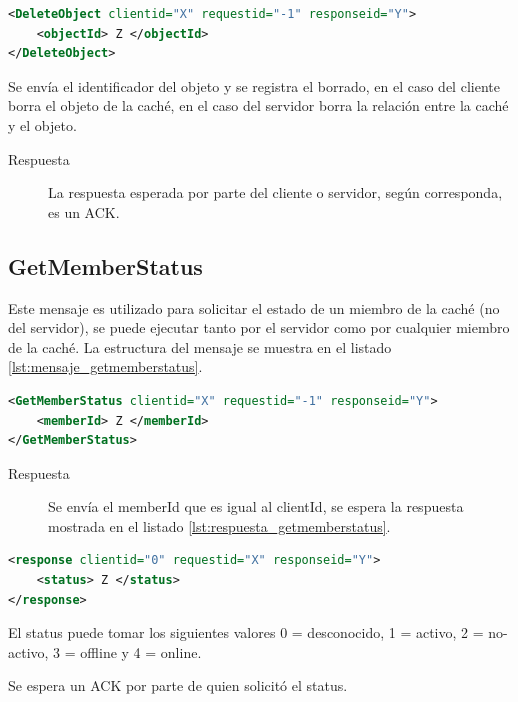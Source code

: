 \begin{lstlisting}[language=XML,caption={Mensaje de DeleteObject},label={lst:mensaje_deleteobject}]
<DeleteObject clientid="X" requestid="-1" responseid="Y"> 
	<objectId> Z </objectId>
</DeleteObject>
\end{lstlisting}

Se envía el identificador del objeto y se registra el borrado, en el caso del cliente borra el objeto de la caché, en el caso del servidor borra la relación entre la caché y el objeto.

\begin{description}
\item[Respuesta] La respuesta esperada por parte del cliente o servidor, según corresponda, es un ACK.
\end{description}

\subsection{GetMemberStatus}
\label{GetMemberStatus} 
Este mensaje es utilizado para solicitar el estado de un miembro de la caché (no del servidor), se puede ejecutar tanto por el servidor como por cualquier miembro de la caché. La estructura del mensaje se muestra en el listado \ref{lst:mensaje_getmemberstatus}.

\begin{lstlisting}[language=XML,caption={Mensaje de GetMemberStatus},label={lst:mensaje_getmemberstatus}]
<GetMemberStatus clientid="X" requestid="-1" responseid="Y"> 
	<memberId> Z </memberId>
</GetMemberStatus>
\end{lstlisting}

\begin{description}
\item[Respuesta] Se envía el memberId que es igual al clientId, se espera la respuesta mostrada en el listado \ref{lst:respuesta_getmemberstatus}.
\end{description}

\begin{lstlisting}[language=XML,caption={Mensaje de Respuesta de GetMemberStatus},label={lst:respuesta_getmemberstatus}]
<response clientid="0" requestid="X" responseid="Y"> 
	<status> Z </status>
</response>
\end{lstlisting}

El status puede tomar los siguientes valores 0 = desconocido, 1 = activo, 2 = no-activo, 3 = offline y 4 = online.

Se espera un ACK por parte de quien solicitó el status.

